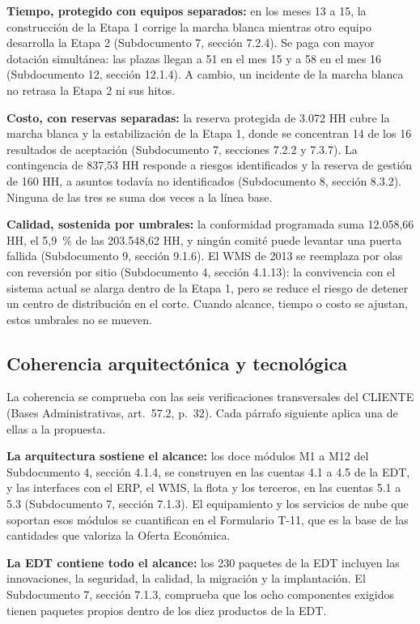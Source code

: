 \textbf{Tiempo, protegido con equipos separados:} en los meses 13 a 15, la construcción de la Etapa 1 corrige la marcha blanca mientras otro equipo desarrolla la Etapa 2 (Subdocumento 7, sección 7.2.4). Se paga con mayor dotación simultánea: las plazas llegan a 51 en el mes 15 y a 58 en el mes 16 (Subdocumento 12, sección 12.1.4). A cambio, un incidente de la marcha blanca no retrasa la Etapa 2 ni sus hitos.

\textbf{Costo, con reservas separadas:} la reserva protegida de 3.072 HH cubre la marcha blanca y la estabilización de la Etapa 1, donde se concentran 14 de los 16 resultados de aceptación (Subdocumento 7, secciones 7.2.2 y 7.3.7). La contingencia de 837,53 HH responde a riesgos identificados y la reserva de gestión de 160 HH, a asuntos todavía no identificados (Subdocumento 8, sección 8.3.2). Ninguna de las tres se suma dos veces a la línea base.

\textbf{Calidad, sostenida por umbrales:} la conformidad programada suma 12.058,66 HH, el 5,9~\% de las 203.548,62 HH, y ningún comité puede levantar una puerta fallida (Subdocumento 9, sección 9.1.6). El WMS de 2013 se reemplaza por olas con reversión por sitio (Subdocumento 4, sección 4.1.13): la convivencia con el sistema actual se alarga dentro de la Etapa 1, pero se reduce el riesgo de detener un centro de distribución en el corte. Cuando alcance, tiempo o costo se ajustan, estos umbrales no se mueven.

\subsection{Coherencia arquitectónica y tecnológica}

La coherencia se comprueba con las seis verificaciones transversales del CLIENTE (Bases Administrativas, art.~57.2, p.~32). Cada párrafo siguiente aplica una de ellas a la propuesta.

\textbf{La arquitectura sostiene el alcance:} los doce módulos M1 a M12 del Subdocumento 4, sección 4.1.4, se construyen en las cuentas 4.1 a 4.5 de la EDT, y las interfaces con el ERP, el WMS, la flota y los terceros, en las cuentas 5.1 a 5.3 (Subdocumento 7, sección 7.1.3). El equipamiento y los servicios de nube que soportan esos módulos se cuantifican en el Formulario T-11, que es la base de las cantidades que valoriza la Oferta Económica.

\textbf{La EDT contiene todo el alcance:} los 230 paquetes de la EDT incluyen las innovaciones, la seguridad, la calidad, la migración y la implantación. El Subdocumento 7, sección 7.1.3, comprueba que los ocho componentes exigidos tienen paquetes propios dentro de los diez productos de la EDT.

